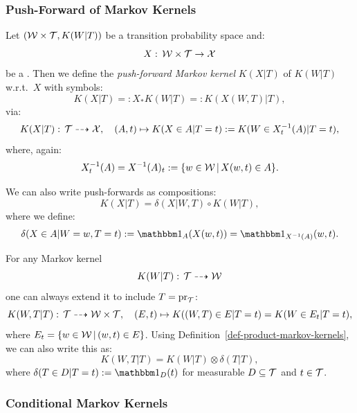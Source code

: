 \subsubsection{Push-Forward of Markov Kernels}



\begin{Def}
    Let $ (\mathcal{W} \times \mathcal{T},K(W|T))$ be a transition probability space and:
    \[ X:\, \mathcal{W} \times \mathcal{T} \to \mathcal{X}  \]
    be a \trv{}.
    Then we define the \emph{push-forward Markov kernel} $K(X|T)$ of $K(W|T)$ w.r.t.\ $X$ with symbols:
    \[K(X|T) =: X_*K(W|T) =: K(X(W,T)|T),\]
    via:
    \[ K(X|T):\, \mathcal{T} \dashrightarrow \mathcal{X},\quad (A,t) \mapsto K(X \in A|T=t) := K(W \in X^{-1}_t(A)|T=t), \]
    where, again:
    \[ X^{-1}_t(A) = X^{-1}(A)_t:= \{ w\in \mathcal{W}\,|\,X(w,t) \in A \}.\]
\end{Def}

\begin{Rem}
    We can also write push-forwards as compositions:
    \[K(X|T) = \delta(X|W,T) \circ K(W|T),\]
    where we define:
    \[\delta(X \in A|W=w,T=t) := \I_A(X(w,t)) = \I_{X^{-1}(A)}(w,t).\]
\end{Rem}

\begin{Rem}\label{rem:extending_markov_kernel}
    For any Markov kernel
    \[ K(W|T):\, \mathcal{T} \dashrightarrow \mathcal{W}\]
    one can always extend it to include $T=\mathrm{pr}_{\mathcal{T}}$:
    \[ K(W,T|T):\, \mathcal{T} \dashrightarrow \mathcal{W} \times \mathcal{T},\quad (E,t) \mapsto 
    K( (W,T)  \in E| T=t) = K( W \in E_t|T=t), \]
    where $E_t = \{ w \in \mathcal{W}\,|\,(w,t) \in E\}$.
    Using Definition~\ref{def-product-markov-kernels}, we can also write this as:
    \[ K(W,T|T) = K(W|T) \otimes \delta(T|T),\]
    where $\delta(T \in D|T=t) := \I_D(t)$ for measurable $D \subseteq \mathcal{T}$ and $t \in \mathcal{T}$.
\end{Rem}


\subsubsection{Conditional Markov Kernels}

